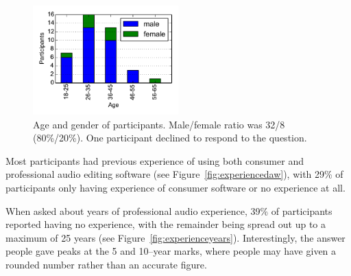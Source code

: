 \begin{figure}[ht]
  \centering
  \includegraphics[width=0.5\textwidth]{figs/age.pdf}
  \caption{Age and gender of participants. Male/female ratio was 32/8
    (80\%/20\%). One participant declined to respond to the question.}
  \label{fig:age}
\end{figure}

Most participants had previous experience of using both consumer and
professional audio editing software (see Figure~\ref{fig:experiencedaw}), with
29\% of participants only having experience of consumer software or no
experience at all.

When asked about years of professional audio experience, 39\% of participants
reported having no experience, with the remainder being spread out up to a
maximum of 25 years (see Figure~\ref{fig:experienceyears}). Interestingly, the
answer people gave peaks at the 5 and 10--year marks, where people may have
given a rounded number rather than an accurate figure.

